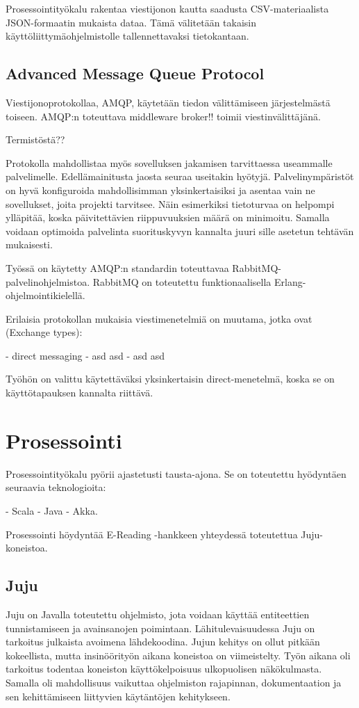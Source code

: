 \documentclass[11pt,a4paper,oneside]{memoir}
\begin{document}
Prosessointityökalu rakentaa viestijonon kautta saadusta CSV-materiaalista JSON-formaatin mukaista dataa. Tämä välitetään takaisin käyttöliittymäohjelmistolle tallennettavaksi tietokantaan. 

\subsection{Advanced Message Queue Protocol}
Viestijonoprotokollaa, AMQP, käytetään tiedon välittämiseen järjestelmästä toiseen. AMQP:n toteuttava middleware broker!! toimii viestinvälittäjänä.

Termistöstä??

Protokolla mahdollistaa myös sovelluksen jakamisen tarvittaessa useammalle palvelimelle. Edellämainitusta jaosta seuraa useitakin hyötyjä. Palvelinympäristöt on hyvä konfiguroida mahdollisimman yksinkertaisiksi ja asentaa vain ne sovellukset, joita projekti tarvitsee. Näin esimerkiksi tietoturvaa on helpompi ylläpitää, koska päivitettävien riippuvuuksien määrä on minimoitu. Samalla voidaan optimoida palvelinta suorituskyvyn kannalta juuri sille asetetun tehtävän mukaisesti.

Työssä on käytetty AMQP:n standardin toteuttavaa RabbitMQ-palvelinohjelmistoa. RabbitMQ on toteutettu funktionaalisella Erlang-ohjelmointikielellä. 

Erilaisia protokollan mukaisia viestimenetelmiä on muutama, jotka ovat (Exchange types):

- direct messaging
- asd asd
- asd asd 

Työhön on valittu käytettäväksi yksinkertaisin direct-menetelmä, koska se on käyttötapauksen kannalta riittävä.

\section{Prosessointi}
Prosessointityökalu pyörii ajastetusti tausta-ajona. Se on toteutettu hyödyntäen seuraavia teknologioita:

- Scala
- Java
- Akka.

Prosessointi höydyntää E-Reading -hankkeen yhteydessä toteutettua Juju-koneistoa.

\subsection{Juju}
Juju on Javalla toteutettu ohjelmisto, jota voidaan käyttää entiteettien tunnistamiseen ja avainsanojen poimintaan. Lähitulevaisuudessa Juju on tarkoitus julkaista avoimena lähdekoodina. Jujun kehitys on ollut pitkään kokeellista, mutta insinöörityön aikana koneistoa on viimeistelty. Työn aikana oli tarkoitus todentaa koneiston käyttökelpoisuus ulkopuolisen näkökulmasta. Samalla oli mahdollisuus vaikuttaa ohjelmiston rajapinnan, dokumentaation ja sen kehittämiseen liittyvien käytäntöjen kehitykseen.
\end{document}
